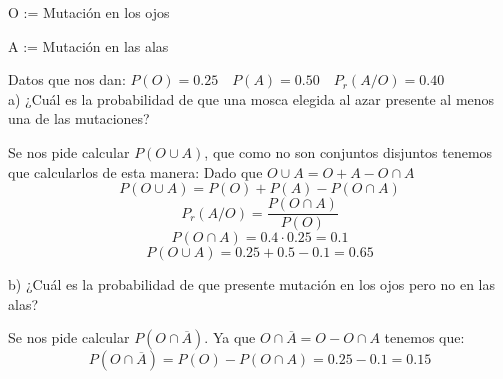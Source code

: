 \problem

O := Mutación en los ojos

A := Mutación en las alas

Datos que nos dan: $P(O) = 0.25 \quad P(A) = 0.50 \quad P_r(A/O) = 0.40$\\

\subproblem
a) ¿Cuál es la probabilidad de que una mosca elegida al azar presente al menos una de las mutaciones?

Se nos pide calcular $P(O \cup A)$, que como no son conjuntos disjuntos tenemos que calcularlos de esta manera: Dado que $O \cup A = O + A - O \cap A$ \\
$$P(O \cup A) = P(O) + P(A) - P(O \cap A)$$
$$P_r(A/O) = \dfrac{P(O \cap A)}{P(O)}$$
$$P(O \cap A) = 0.4 \cdot 0.25 = 0.1$$
$$P(O \cup A) = 0.25 + 0.5 - 0.1 = 0.65$$

\subproblem
b) ¿Cuál es la probabilidad de que presente mutación en los ojos pero no en las alas?

Se nos pide calcular $P(O \cap \overline{A})$. Ya que $O \cap \overline{A} = O - O \cap A$ tenemos que:
$$P(O \cap \overline{A}) = P(O) - P(O \cap A) = 0.25 - 0.1 = 0.15$$

